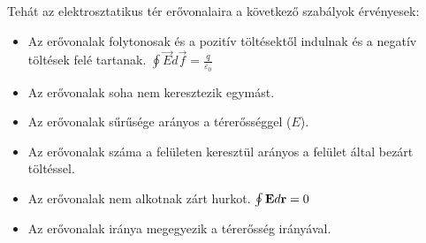 \documentclass[a4paper,12pt]{article}
\begin{document}
Tehát az elektrosztatikus tér erővonalaira a következő szabályok érvényesek:
\begin{itemize}
    \item Az erővonalak folytonosak és a pozitív töltésektől indulnak és a negatív töltések felé tartanak. $\oint \vec{E} d\vec{f} = \frac{q}{\varepsilon_0}$
    \item Az erővonalak soha nem keresztezik egymást.
    \item Az erővonalak sűrűsége arányos a térerősséggel ($E$).
    \item Az erővonalak száma a felületen keresztül arányos a felület által bezárt töltéssel.
    \item Az erővonalak nem alkotnak zárt hurkot. $\oint \bold{E} d\bold{r} = 0$
    \item Az erővonalak iránya megegyezik a térerősség irányával.
\end{itemize}
\end{document}
